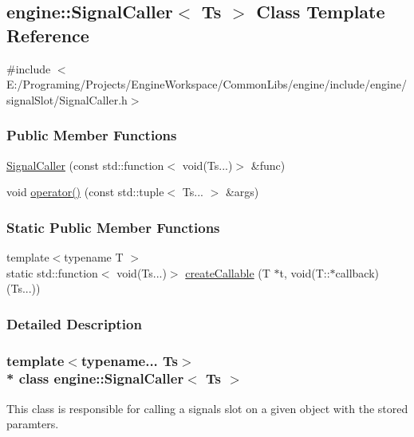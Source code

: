\hypertarget{a00066}{}\subsection{engine\+:\+:Signal\+Caller$<$ Ts $>$ Class Template Reference}
\label{a00066}


{\ttfamily \#include $<$E\+:/\+Programing/\+Projects/\+Engine\+Workspace/\+Common\+Libs/engine/include/engine/signal\+Slot/\+Signal\+Caller.\+h$>$}

\subsubsection*{Public Member Functions}
\begin{DoxyCompactItemize}
\item 
\hyperlink{a00066_a0ac1c86918e5e9398dbb1cb587835ee1}{Signal\+Caller} (const std\+::function$<$ void(Ts...)$>$ \&func)
\item 
void \hyperlink{a00066_a51aed6d729065df2d78aa8acab3e0eb9}{operator()} (const std\+::tuple$<$ Ts... $>$ \&args)
\end{DoxyCompactItemize}
\subsubsection*{Static Public Member Functions}
\begin{DoxyCompactItemize}
\item 
{\footnotesize template$<$typename T $>$ }\\static std\+::function$<$ void(Ts...)$>$ \hyperlink{a00066_a6a9a7e7fc96f6921fc74b6386651afdc}{create\+Callable} (T $\ast$t, void(T\+::$\ast$callback)(Ts...))
\end{DoxyCompactItemize}


\subsubsection{Detailed Description}
\subsubsection*{template$<$typename... Ts$>$\\*
class engine\+::\+Signal\+Caller$<$ Ts $>$}

This class is responsible for calling a signal\textquotesingle{}s slot on a given object with the stored paramters. 

